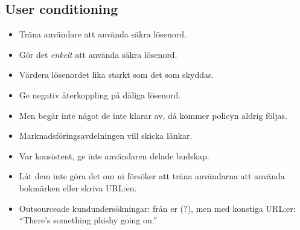 \documentclass{beamer}
\begin{document}
\subsection{User conditioning}

\begin{frame}
  \begin{itemize}
    \item Träna användare att använda säkra lösenord.
    \item Gör det \emph{enkelt} att använda säkra lösenord.
    \item Värdera lösenordet lika starkt som det som skyddas.
    \item Ge negativ återkoppling på dåliga lösenord.
    \item Men begär inte något de inte klarar av, då kommer policyn aldrig 
      följas.
  \end{itemize}
\end{frame}

\begin{frame}
  \begin{itemize}
    \item Marknadsföringsavdelningen vill skicka länkar.
    \item Var konsistent, ge inte användaren delade budskap.
    \item Låt dem inte göra det om ni försöker att träna användarna att använda 
      bokmärken eller skriva URL:en.
    \item Outsourceade kundundersökningar: från er (?), men med konstiga 
      URL:er:
      \enquote{There's something phishy going on.}
  \end{itemize}
\end{frame}



\begin{frame}[allowframebreaks]
	\small
  \printbibliography{}
\end{frame}
\end{document}
